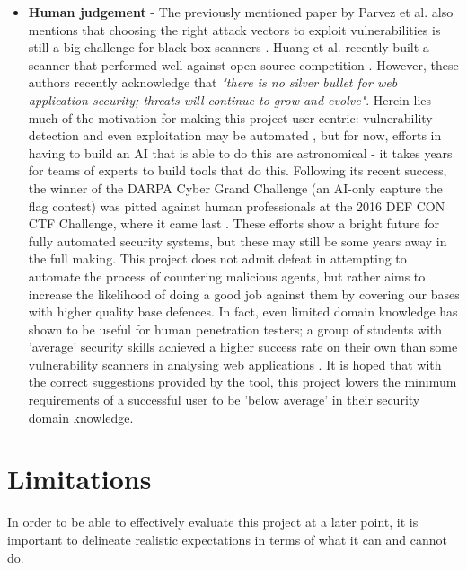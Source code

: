 \begin{itemize}
	
	\item \textbf{Human judgement} - The previously mentioned paper by Parvez et al. also mentions that choosing the right attack vectors to exploit vulnerabilities is still a big challenge for black box scanners \cite{analysisOfEffectivenessOfBlackBoxWebAppScannersStoredSQLStoredXSS}. Huang et al. recently built a scanner that performed well against open-source competition \cite{webAppSecThreatsCountermeasuresPitfalls}. However, these authors recently acknowledge that \emph{"there is no silver bullet for web application security; threats will continue to grow and evolve"}. Herein lies much of the motivation for making this project user-centric: vulnerability detection and even exploitation may be automated \cite{darpaAIChallenge}, but for now, efforts in having to build an AI that is able to do this are astronomical - it takes years for teams of experts to build tools that do this. Following its recent success, the winner of the DARPA Cyber Grand Challenge (an AI-only capture the flag contest) was pitted against human professionals at the 2016 DEF CON CTF Challenge, where it came last \cite{defcon16Results}. These efforts show a bright future for fully automated security systems, but these may still be some years away in the full making. This project does not admit defeat in attempting to automate the process of countering malicious agents, but rather aims to increase the likelihood of doing a good job against them by covering our bases with higher quality base defences. In fact, even limited domain knowledge has shown to be useful for human penetration testers; a group of students with 'average' security skills achieved a higher success rate on their own than some vulnerability scanners in analysing web applications \cite{whyJohnnyCantPentest}. It is hoped that with the correct suggestions provided by the tool, this project lowers the minimum requirements of a successful user to be 'below average' in their security domain knowledge. \\
	
\end{itemize}



\section{Limitations}
\label{limitations}

In order to be able to effectively evaluate this project at a later point, it is important to delineate realistic expectations in terms of what it can and cannot do. 

